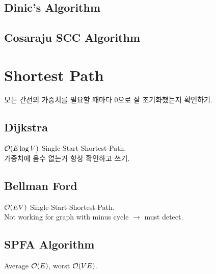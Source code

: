 \documentclass[landscape,8pt]{article}
\begin{document}
\begin{multicols}{2}
  \subsection{Dinic's Algorithm}
    

  \subsection{Cosaraju SCC Algorithm}
    



\section{Shortest Path}
  모든 간선의 가중치를 필요할 때마다 0으로 잘 초기화했는지 확인하기.
  \subsection{Dijkstra}
    $\order{E \log V}$ Single-Start-Shortest-Path.\\
    가중치에 음수 없는거 항상 확인하고 쓰기.
      

  \subsection{Bellman Ford}
    $\order{EV}$ Single-Start-Shortest-Path.\\
    Not working for graph with minus cycle $\rightarrow$ must detect.
      

  \subsection{SPFA Algorithm}
    Average $\order{E}$, worst $\order{VE}$.
    


\end{multicols}
\end{document}
